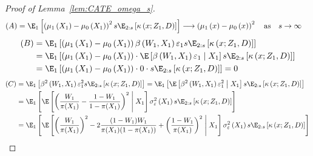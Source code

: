 \begin{proof}[Proof of Lemma~\ref{lem:CATE_omega_s}]
    \begin{equation}
        \begin{aligned}
            (A) 
            & = \E_{1}\left[\left(\mu_{1}\left(X_1\right) - \mu_{0}\left(X_1\right)\right)^2 s \E_{2:s}\left[\kappa\left(x; Z_1, D\right)\right]\right]
            \longrightarrow \left(\mu_{1}\left(x\right) - \mu_{0}\left(x\right)\right)^2
            \quad \text{as} \quad s \rightarrow \infty
        \end{aligned}
    \end{equation}
    \begin{equation}
        \begin{aligned}
            (B)
            & = \E_{1}\left[\left(\mu_{1}\left(X_1\right) - \mu_{0}\left(X_1\right)\right)\beta\left(W_{1}, X_1\right)\varepsilon_1 s \E_{2:s}\left[\kappa\left(x; Z_1, D\right)\right]\right] \\
            & = \E_{1}\left[\left(\mu_{1}\left(X_1\right) - \mu_{0}\left(X_1\right)\right) \cdot \E\left[\beta\left(W_{1}, X_1\right)\varepsilon_1 \; \middle| \; X_1\right] s \E_{2:s}\left[\kappa\left(x; Z_1, D\right)\right]\right] \\
            & = \E_{1}\left[\left(\mu_{1}\left(X_1\right) - \mu_{0}\left(X_1\right)\right) \cdot 0 \cdot s \E_{2:s}\left[\kappa\left(x; Z_1, D\right)\right]\right] 
            = 0
        \end{aligned}
    \end{equation}
    \newpage
    \begin{equation}
        \begin{aligned}
            (C)
            & = \E_{1}\left[\beta^2\left(W_{1}, X_1\right)\varepsilon_1^2 s \E_{2:s}\left[\kappa\left(x; Z_1, D\right)\right]\right] 
            = \E_{1}\left[\E\left[\beta^2\left(W_{1}, X_1\right)\varepsilon_1^2 \; \middle| \; X_1\right] s \E_{2:s}\left[\kappa\left(x; Z_1, D\right)\right]\right] \\
            & = \E_{1}\left[\E\left[\left(\frac{W_{1}}{\pi(X_1)} - \frac{1 - W_{1}}{1 - \pi(X_1)}\right)^2 \; \middle| \; X_1\right] \sigma_{\varepsilon}^2\left(X_1\right) s \E_{2:s}\left[\kappa\left(x; Z_1, D\right)\right]\right] \\
            & = \E_{1}\left[\E\left[\left(\frac{W_{1}}{\pi(X_1)}\right)^2 - 2 \frac{(1 - W_{1})W_{1}}{\pi(X_1)(1 - \pi(X_1))} + \left(\frac{1 - W_{1}}{\pi(X_1)}\right)^2 \; \middle| \; X_1\right] \sigma_{\varepsilon}^2\left(X_1\right) s \E_{2:s}\left[\kappa\left(x; Z_1, D\right)\right]\right] \\ 

\end{aligned}
\end{equation}
\end{proof}
